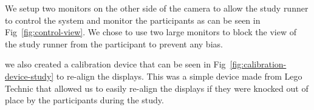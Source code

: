 We setup two monitors on the other side of the camera to allow the study runner to control the system and monitor the participants as can be seen in Fig~\ref{fig:control-view}. We chose to use two large monitors to block the view of the study runner from the participant to prevent any bias. \\

\begin{invisBox}  
	\hfill
\end{invisBox}

we also created a calibration device that can be seen in Fig~\ref{fig:calibration-device-study} to re-align the displays. This was a simple device made from Lego Technic \tocite that allowed us to easily re-align the displays if they were knocked out of place by the participants during the study.

